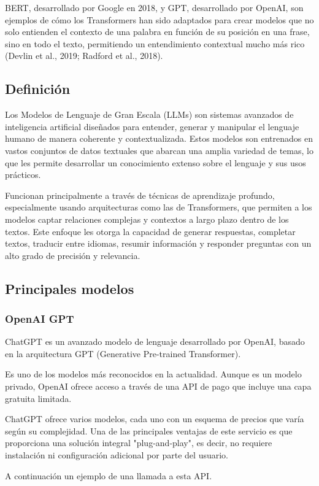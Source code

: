 BERT, desarrollado por Google en 2018, y GPT, desarrollado por OpenAI, son ejemplos de
cómo los Transformers han sido adaptados para crear modelos que
no solo entienden el contexto de una palabra en función de su posición en una frase, sino en todo
el texto, permitiendo un entendimiento contextual mucho más rico (Devlin et al., 2019; Radford et al., 2018).

\subsection*{Definición}
Los Modelos de Lenguaje de Gran Escala (LLMs) son sistemas
avanzados de inteligencia artificial diseñados para entender, generar y
manipular el lenguaje humano de manera coherente y contextualizada. Estos
modelos son entrenados en vastos conjuntos de datos textuales que abarcan una amplia variedad de temas, lo que les
permite desarrollar un conocimiento extenso sobre el lenguaje y sus usos prácticos.

Funcionan principalmente a través de técnicas de aprendizaje
profundo, especialmente usando arquitecturas como las de Transformers,
que permiten a los modelos captar relaciones complejas y contextos a largo plazo dentro de los textos. Este enfoque les
otorga la capacidad de generar respuestas, completar textos,
traducir entre idiomas, resumir información y responder preguntas con un alto grado de precisión y relevancia.

\subsection*{Principales modelos}
\subsubsection*{OpenAI GPT}
ChatGPT es un avanzado modelo de lenguaje desarrollado por OpenAI,
basado en la arquitectura GPT (Generative Pre-trained Transformer).

Es uno de los modelos más reconocidos en la actualidad. Aunque es un modelo privado, OpenAI ofrece
acceso a través de una API de pago que incluye una capa gratuita limitada.

ChatGPT ofrece varios modelos, cada uno con un esquema de precios que varía según
su complejidad. Una de las principales ventajas de este servicio
es que proporciona una solución integral "plug-and-play",
es decir, no requiere instalación ni configuración adicional por parte del usuario.

A continuación un ejemplo de una llamada a esta API.


